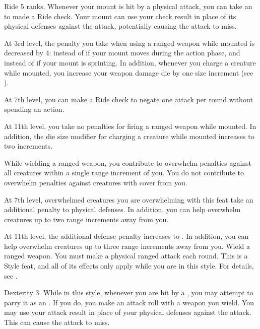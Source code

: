     \featpre Ride 5 ranks.
    \featben Whenever your mount is hit by a physical attack, you can take an  to made a Ride check.
    Your mount can use your check result in place of its physical defenses against the attack, potentially causing the attack to miss.

    At 3rd level, the penalty you take when using a ranged weapon while mounted is decreased by 4:  instead of  if your mount moves during the action phase, and  instead of  if your mount is sprinting.
    In addition, whenever you charge a creature while mounted, you increase your weapon damage die by one size increment (see ).

    At 7th level, you can make a Ride check to negate one attack per round without spending an action.

    At 11th level, you take no penalties for firing a ranged weapon while mounted.
    In addition, the die size modifier for charging a creature while mounted increases to two increments.

    \featben While wielding a ranged weapon, you contribute to overwhelm penalties against all creatures within a single range increment of you.
    You do not contribute to overwhelm penalties against creatures with cover from you.

    At 7th level, overwhelmed creatures you are overwhelming with this feat take an additional  penalty to physical defenses.
    In addition, you can help overwhelm creatures up to two range increments away from you.

    At 11th level, the additional defense penalty increases to .
    In addition, you can help overwhelm creatures up to three range increments away from you.
    \stylereq Wield a ranged weapon.
    You must make a physical ranged attack each round.
     This is a Style feat, and all of its effects only apply while you are in this style.
    For details, see .

    \featpre Dexterity 3.
    \featben While in this style, whenever you are hit by a , you may attempt to parry it as an .
    If you do, you make an attack roll with a weapon you wield.
    You may use your attack result in place of your physical defenses against the attack.
    This can cause the attack to miss.

